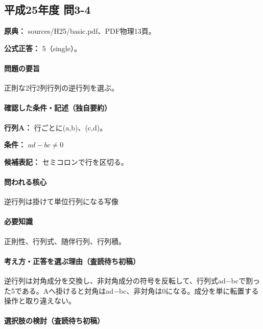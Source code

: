 \subsection{平成25年度 問3-4}
\label{q:h25-reg-basic-3-4}

\noindent\textbf{原典：} sources/H25/basic.pdf、PDF物理13頁。

\textbf{公式正答：} 5（single）。

\paragraph{問題の要旨} 正則な2行2列行列の逆行列を選ぶ。

\paragraph{確認した条件・記述（独自要約）}\mbox{}\par

\noindent\textbf{行列A：} 行ごとに(a,b)、(c,d)。\par

\noindent\textbf{条件：} \(ad-bc\neq0\)\par

\noindent\textbf{候補表記：} セミコロンで行を区切る。\par

\paragraph{問われる核心} 逆行列は掛けて単位行列になる写像

\paragraph{必要知識} 正則性、行列式、随伴行列、行列積。

\paragraph{考え方・正答を選ぶ理由（査読待ち初稿）} 逆行列は対角成分を交換し、非対角成分の符号を反転して、行列式ad−bcで割った5である。Aへ掛けると対角はad−bc、非対角は0になる。成分を単に転置する操作と取り違えない。

\paragraph{選択肢の検討（査読待ち初稿）}\mbox{}\par

